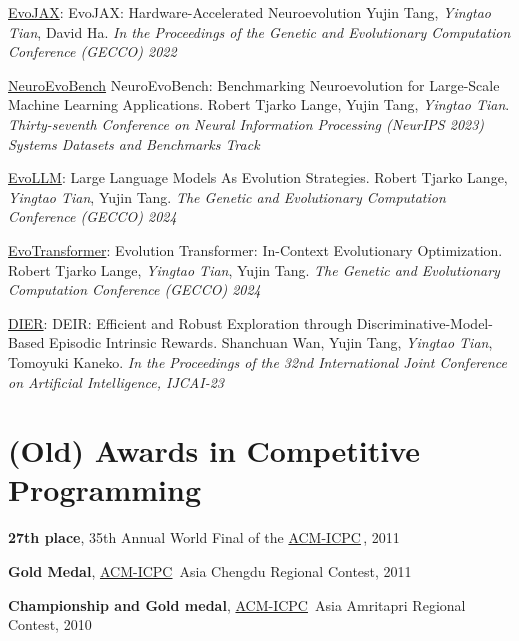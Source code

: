 \documentclass[line,margin]{cv}
\newcommand{\myemph}{\textbf}
\newcommand{\ICPC}{\href{http://https://icpc.global//}{ACM-ICPC}}
\begin{document}
\begin{resume}
  \underline{EvoJAX}: {EvoJAX: Hardware-Accelerated Neuroevolution}
  Yujin Tang, \emph{Yingtao Tian}, David Ha.   \emph{In the Proceedings of the Genetic and Evolutionary Computation Conference (GECCO) 2022}

  \underline{NeuroEvoBench} {NeuroEvoBench: Benchmarking Neuroevolution for Large-Scale Machine Learning Applications}.
  Robert Tjarko Lange, Yujin Tang, \emph{Yingtao Tian}. \emph{Thirty-seventh Conference on Neural Information Processing (NeurIPS 2023) Systems Datasets and Benchmarks Track}

  \underline{EvoLLM}: {Large Language Models As Evolution Strategies}.
  Robert Tjarko Lange, \emph{Yingtao Tian}, Yujin Tang. \emph{The Genetic and Evolutionary Computation Conference (GECCO) 2024}

  \underline{EvoTransformer}: {Evolution Transformer: In-Context Evolutionary Optimization}.
  Robert Tjarko Lange, \emph{Yingtao Tian}, Yujin Tang. \emph{The Genetic and Evolutionary Computation Conference (GECCO) 2024}

  \underline{DIER}: {DEIR: Efficient and Robust Exploration through Discriminative-Model-Based Episodic Intrinsic Rewards}.
  Shanchuan Wan, Yujin Tang, \emph{Yingtao Tian}, Tomoyuki Kaneko. \emph{In the Proceedings of the 32nd International Joint Conference on Artificial Intelligence, IJCAI-23}


\section{(Old) Awards in Competitive Programming}
  \myemph{27th place}, 35th Annual World Final of the \ICPC \,, 2011

  \myemph{Gold Medal}, \ICPC\ Asia Chengdu Regional Contest, 2011

  \myemph{Championship and Gold medal}, \ICPC\ Asia Amritapri Regional Contest, 2010

\end{resume}
\end{document}
